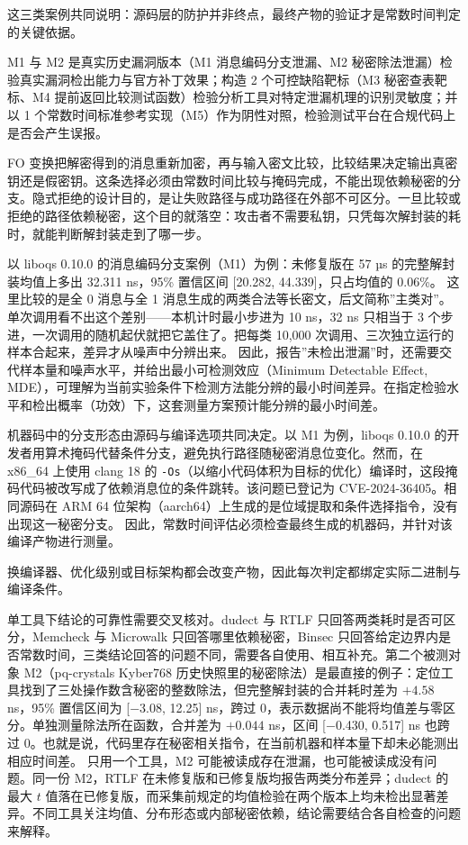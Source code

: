 这三类案例共同说明：源码层的防护并非终点，最终产物的验证才是常数时间判定的关键依据。

M1 与 M2 是真实历史漏洞版本（M1 消息编码分支泄漏、M2 秘密除法泄漏）检验真实漏洞检出能力与官方补丁效果；构造 2 个可控缺陷靶标（M3 秘密查表靶标、M4 提前返回比较测试函数）检验分析工具对特定泄漏机理的识别灵敏度；并以 1 个常数时间标准参考实现（M5）作为阴性对照，检验测试平台在合规代码上是否会产生误报。

FO 变换把解密得到的消息重新加密，再与输入密文比较，比较结果决定输出真密钥还是假密钥。这条选择必须由常数时间比较与掩码完成，不能出现依赖秘密的分支。隐式拒绝的设计目的，是让失败路径与成功路径在外部不可区分。一旦比较或拒绝的路径依赖秘密，这个目的就落空：攻击者不需要私钥，只凭每次解封装的耗时，就能判断解封装走到了哪一步。

以 liboqs 0.10.0 的消息编码分支案例（M1）为例：未修复版在 57 µs 的完整解封装均值上多出 32.311 ns，95\% 置信区间 [20.282, 44.339]，只占均值的 0.06\%。%
这里比较的是全 0 消息与全 1 消息生成的两类合法等长密文，后文简称”主类对”。单次调用看不出这个差别——本机计时最小步进为 10 ns，32 ns 只相当于 3 个步进，一次调用的随机起伏就把它盖住了。把每类 10,000 次调用、三次独立运行的样本合起来，差异才从噪声中分辨出来。%
因此，报告”未检出泄漏”时，还需要交代样本量和噪声水平，并给出最小可检测效应（Minimum Detectable Effect, MDE），可理解为当前实验条件下检测方法能分辨的最小时间差异。在指定检验水平和检出概率（功效）下，这套测量方案预计能分辨的最小时间差。

机器码中的分支形态由源码与编译选项共同决定。以 M1 为例，liboqs 0.10.0 的开发者用算术掩码代替条件分支，避免执行路径随秘密消息位变化。然而，在 x86\_64 上使用 clang 18 的 \texttt{-Os}（以缩小代码体积为目标的优化）编译时，这段掩码代码被改写成了依赖消息位的条件跳转。该问题已登记为 CVE-2024-36405\cite{ghsa-f2v9}。相同源码在 ARM 64 位架构（aarch64）上生成的是位域提取和条件选择指令，没有出现这一秘密分支。%
因此，常数时间评估必须检查最终生成的机器码，并针对该编译产物进行测量。

换编译器、优化级别或目标架构都会改变产物，因此每次判定都绑定实际二进制与编译条件。

单工具下结论的可靠性需要交叉核对。dudect 与 RTLF 只回答两类耗时是否可区分\cite{dudect,rtlf}，Memcheck 与 Microwalk 只回答哪里依赖秘密\cite{ctgrind,microwalk}，Binsec 只回答给定边界内是否常数时间\cite{binsec}，三类结论回答的问题不同，需要各自使用、相互补充。第二个被测对象 M2（pq-crystals Kyber768 历史快照里的秘密除法）是最直接的例子：定位工具找到了三处操作数含秘密的整数除法，但完整解封装的合并耗时差为 $+4.58$ ns，95\% 置信区间为 [$-$3.08, 12.25] ns，跨过 0，表示数据尚不能将均值差与零区分。单独测量除法所在函数，合并差为 $+0.044$ ns，区间 [$-$0.430, 0.517] ns 也跨过 0。也就是说，代码里存在秘密相关指令，在当前机器和样本量下却未必能测出相应时间差。%
只用一个工具，M2 可能被读成存在泄漏，也可能被读成没有问题。同一份 M2，RTLF 在未修复版和已修复版均报告两类分布差异；dudect 的最大 $t$ 值落在已修复版，而采集前规定的均值检验在两个版本上均未检出显著差异。不同工具关注均值、分布形态或内部秘密依赖，结论需要结合各自检查的问题来解释。


